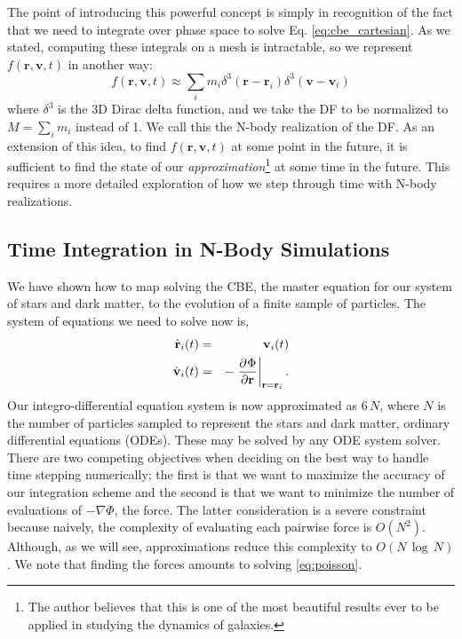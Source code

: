 The point of introducing this powerful concept is simply in recognition of the fact that we need to integrate over phase space to solve Eq. \eqref{eq:cbe_cartesian}. As we stated, computing these integrals on a mesh is intractable, so we represent $f(\textbf{r},\textbf{v},t)$ in another way:
\begin{equation}
f(\textbf{r},\textbf{v},t) \approx \sum_i m_i \delta^3(\textbf{r} - \textbf{r}_i) \delta^3(\textbf{v} - \textbf{v}_i)
\end{equation}
where $\delta^3$ is the 3D Dirac delta function, and we take the DF to be normalized to $M = \sum_i m_i$ instead of 1. We call this the N-body realization of the DF. As an extension of this idea, to find $f(\textbf{r},\textbf{v},t)$ at some point in the future, it is sufficient to find the state of our \textit{approximation}\footnote{The author believes that this is one of the most beautiful results ever to be applied in studying the dynamics of galaxies.} at some time in the future. This requires a more detailed exploration of how we step through time with N-body realizations.

\subsection{Time Integration in N-Body Simulations} \label{ssec:time_int}

We have shown how to map solving the CBE, the master equation for our system of stars and dark matter, to the evolution of a finite sample of particles. The system of equations we need to solve now is,
\begin{eqnarray} \label{eq:nbody_system}
\dot{\textbf{r}}_i(t) &=& \textbf{v}_i(t)\\
\dot{\textbf{v}}_i(t) &=& -\left.\frac{\partial^{} {\Phi}}{\partial {\textbf{r}}^{}}\right\vert_{\textbf{r} = \textbf{r}_i}.
\end{eqnarray}
Our integro-differential equation system is now approximated as $6\,N$, where $N$ is the number of particles sampled to represent the stars and dark matter, ordinary differential equations (ODEs). These may be solved by any ODE system solver. There are two competing objectives when deciding on the best way to handle time stepping numerically; the first is that we want to maximize the accuracy of our integration scheme and the second is that we want to minimize the number of evaluations of $-\nabla \Phi$, the force. The latter consideration is a severe constraint because naively, the complexity of evaluating each pairwise force is $O(N^2)$.  Although, as we will see, approximations reduce this complexity to $O(N\,\log \, N)$. We note that finding the forces amounts to solving \eqref{eq:poisson}.

